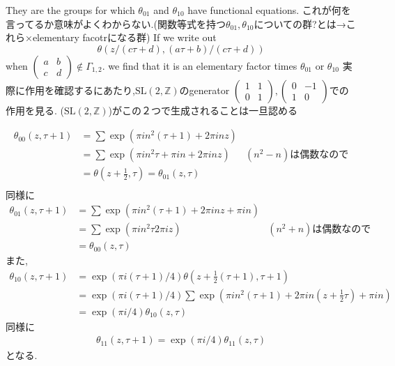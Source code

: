\documentclass[uplatex,b5j,11pt]{jsbook}
\begin{document}
They are the groups for which $\theta_{01}$ and $\theta_{10}$ have functional equations.
これが何を言ってるか意味がよくわからない.(関数等式を持つ$\theta_{01}, \theta_{10}$についての群?とは→これら×elementary facotrになる群)
If  we write out
\begin{equation*}
    \theta(z/(c \tau + d), (a \tau +b)/(c \tau + d))
\end{equation*}
when $
\begin{pmatrix}
a & b \\
c & d
\end{pmatrix}
 \notin \Gamma_{1,2}$.
 we find that it is an elementary factor times $\theta_{01}$ or $\theta_{10}$
 実際に作用を確認するにあたり,$\mathrm{SL}(2, \mathbb{Z})$のgenerator
 $
\begin{pmatrix}
1 & 1 \\
0 & 1
\end{pmatrix},
\begin{pmatrix}
0 & -1 \\
1 & 0
\end{pmatrix}
$での作用を見る.
($\mathrm{SL}(2, \mathbb{Z})$)がこの２つで生成されることは一旦認める

\begin{align*}
\theta_{00}(z, \tau + 1)
& = \sum \exp(\pi i n^2 (\tau + 1) + 2 \pi i n z) \\
& = \sum \exp(\pi i n^2 \tau  + \pi i n + 2\pi i nz) & (n^2-n) \mbox{は偶数なので} \\
& = \theta(z + \frac{1}{2}, \tau) = \theta_{01}(z, \tau) \\
\end{align*}
同様に
\begin{align*}
\theta_{01}(z, \tau + 1)
& = \sum \exp(\pi i n^2 (\tau + 1) + 2 \pi i n z + \pi in ) \\
& = \sum \exp(\pi i n^2 \tau   2\pi i z ) & (n^2+n) \mbox{は偶数なので} \\
& = \theta_{00}(z, \tau)
\end{align*}
また,
\begin{align*}
\theta_{10}(z, \tau + 1)
& = \exp(\pi i (\tau + 1)/4 )\theta(z + \frac{1}{2}(\tau + 1), \tau+1) \\
& = \exp(\pi i (\tau + 1)/4 )\sum \exp(\pi i n^2 (\tau + 1) + 2 \pi i n (z + \frac{1}{2}\tau) + \pi in ) \\
& = \exp(\pi i /4)\theta_{10}(z, \tau)
\end{align*}
同様に
\begin{align*}
\theta_{11}(z, \tau+1) = \exp(\pi i /4) \theta_{11}(z, \tau)
\end{align*}
となる.
\end{document}
